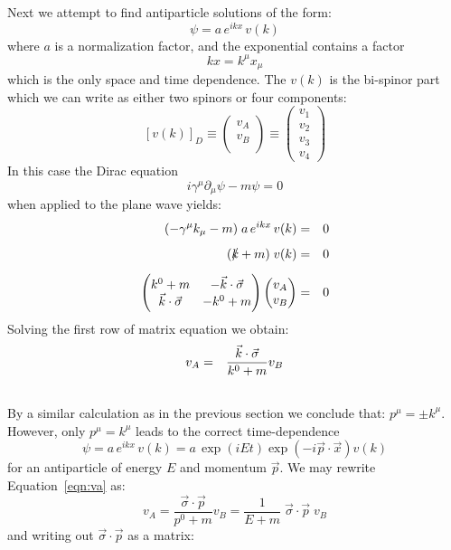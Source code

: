 \documentclass[12pt]{article}
\begin{document}
Next we attempt to find antiparticle solutions of the form:
$$\psi = a \, e^{ikx} \, v(k)$$
where $a$ is a normalization factor, and the exponential contains a factor
$$kx = k^\mu x_\mu$$
which is the only space and time dependence.  The $v(k)$ is the bi-spinor part which we can write as either two spinors or four components:
$$[v(k)]_D \equiv \begin{pmatrix} v_A \\ v_B \\ \end{pmatrix} \equiv
\begin{pmatrix} v_1 \\ v_2\\ v_3 \\ v_4 \end{pmatrix}
$$
In this case the Dirac equation
$$i \gamma^\mu \partial_\mu \psi - m \psi = 0$$
when applied to the plane wave yields:
\begin{eqnarray*}
(- \gamma^\mu k_\mu - m) \; a \, e^{ikx} \, v(k) &=& 0 \\[5pt]
( \slashed{k} + m) \; v(k) &=& 0 \\[5pt]
\begin{pmatrix}
 k^0+m & -  \vec{k}\cdot\vec{\sigma} \\
 \vec{k}\cdot\vec{\sigma} & - k^0+m \\
\end{pmatrix}
\begin{pmatrix}
v_A\\
v_B\\
\end{pmatrix}&=&0\\
\end{eqnarray*}
Solving the first row of matrix equation we obtain:
\begin{eqnarray}
v_A &=& \frac{\vec{k}\cdot\vec{\sigma}}{ k^0+m} v_B \label{eqn:va} \\
\notag
\end{eqnarray}
By a similar calculation as in the previous section we conclude that:
$p^\mu = \pm  k^\mu$.  However, only $p^\mu =  k^\mu$
leads to the correct time-dependence
$$\psi = a \, e^{ikx} \, v(k) = a \, \exp(iEt) \exp(-i\vec{p}\cdot\vec{x}) v(k)$$
for an antiparticle of energy $E$ and momentum $\vec{p}$.  We may rewrite Equation~\ref{eqn:va} as:
$$v_A = \frac{\vec{\sigma}\cdot\vec{p}}{p^0+m} v_B = \frac{1}{E+m} \; \vec{\sigma}\cdot\vec{p} \; v_B$$
and writing out $\vec{\sigma}\cdot\vec{p}$ as a matrix:
\end{document}
